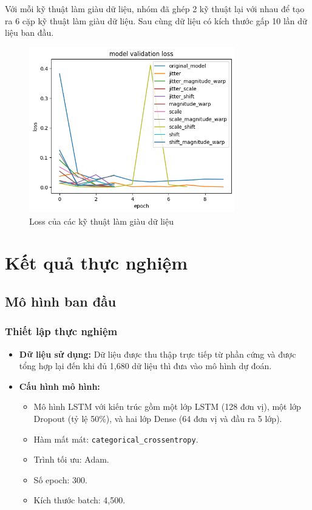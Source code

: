 Với mỗi kỹ thuật làm giàu dữ liệu, nhóm đã ghép 2 kỹ thuật lại với nhau để tạo ra 6 cặp kỹ thuật làm giàu dữ liệu. 
Sau cùng dữ liệu có kích thước gấp 10 lần dữ liệu ban đầu.

\begin{figure}[H]
    \centering
    \includegraphics[width=0.8\textwidth]{Images/Improvement results/data_augmentation_loss.png}
    \caption{Loss của các kỹ thuật làm giàu dữ liệu}
    \label{fig:data_augmentation_loss}
\end{figure}


\section{Kết quả thực nghiệm}
\subsection{Mô hình ban đầu}

\subsubsection{Thiết lập thực nghiệm}
\begin{itemize}
    \item \textbf{Dữ liệu sử dụng:} Dữ liệu được thu thập trực tiếp từ phần cứng và được tổng hợp lại đến khi đủ 1,680 dữ liệu thì đưa vào mô hình dự đoán.
    \item \textbf{Cấu hình mô hình:}
    \begin{itemize}
        \item Mô hình LSTM với kiến trúc gồm một lớp LSTM (128 đơn vị), một lớp Dropout (tỷ lệ 50\%), và hai lớp Dense (64 đơn vị và đầu ra 5 lớp).
        \item Hàm mất mát: \texttt{categorical\_crossentropy}.
        \item Trình tối ưu: Adam.
        \item Số epoch: 300.
        \item Kích thước batch: 4,500.
    \end{itemize}
\end{itemize}

